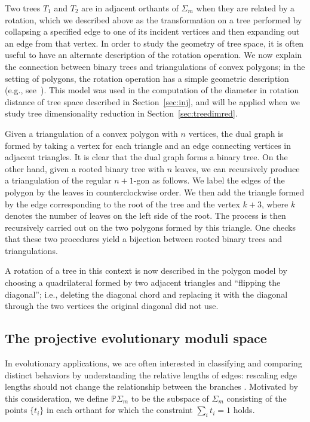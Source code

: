 \documentclass[a4paper,11pt]{article}
\begin{document}
Two trees $T_1$ and $T_2$ are in adjacent orthants of $\Sigma_m$ when they are related by a rotation, which we described above as the transformation on a tree performed by collapsing a specified edge to one of its incident vertices and then expanding out an edge from that vertex.
In order to study the geometry of tree space, it is often useful to have an alternate description of the rotation operation.
We now explain the connection between binary trees and triangulations
of convex polygons; in the setting of polygons, the rotation operation
has a simple geometric description (e.g., see~\cite{sleator1988rotation}).
This model was used in the computation of the diameter in rotation
distance of tree space described in Section~\ref{sec:inj}, and will be
applied when we study tree dimensionality reduction in
Section~\ref{sec:treedimred}.

Given a triangulation of a convex polygon with $n$ vertices, the dual graph is formed by taking a vertex for each triangle and an edge connecting vertices in adjacent triangles.
It is clear that the dual graph forms a binary tree.
On the other hand, given a rooted binary tree with $n$ leaves, we can recursively produce a triangulation of the regular $n+1$-gon as follows.
We label the edges of the polygon by the leaves in counterclockwise order.
We then add the triangle formed by the edge corresponding to the root of the tree and the vertex $k+3$, where $k$ denotes the number of leaves on the left side of the root.
The process is then recursively carried out on the two polygons formed
by this triangle.  One checks that these two procedures yield a
bijection between rooted binary trees and triangulations.

A rotation of a tree in this context is now described in the polygon
model by choosing a quadrilateral formed by two adjacent triangles and
``flipping the diagonal''; i.e., deleting the diagonal chord and
replacing it with the diagonal through the two vertices the original
diagonal did not use.

\subsection{The projective evolutionary moduli space}

In evolutionary applications, we are often interested in classifying
and comparing distinct behaviors by understanding the relative lengths
of edges: rescaling edge lengths should not change the relationship
between the branches \cite{zairis2014moduli}.  Motivated by this consideration, we define
$\mathbb{P} \Sigma_m$ to be the subspace of $\Sigma_m$ consisting of
the points $\{t_i\}$ in each orthant for which the constraint
$\sum_{i} t_i = 1$ holds.
\end{document}
